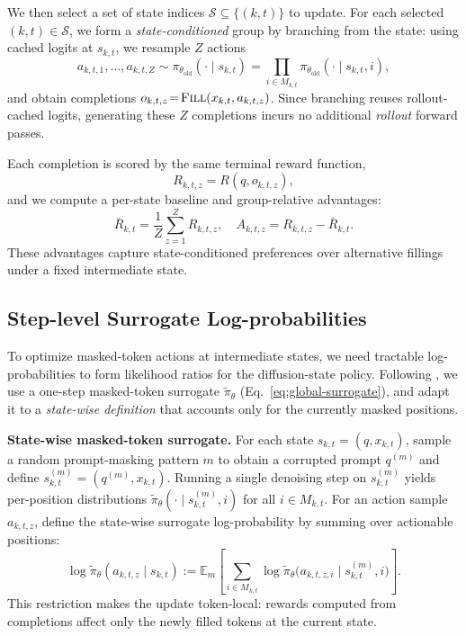 \documentclass{article}
\theoremstyle{plain}
\theoremstyle{definition}
\theoremstyle{remark}
\begin{document}
We then select a set of state indices $\mathcal{S}\subseteq\{(k,t)\}$ to update.
For each selected $(k,t)\in\mathcal{S}$, we form a \emph{state-conditioned} group by branching from the state:
using cached logits at $s_{k,t}$, we resample $Z$ actions
\[
  a_{k,t,1},\dots,a_{k,t,Z}
  \!\sim\!
  \pi_{\theta_{\text{old}}}(\cdot\!\mid\! s_{k,t})
  \!=\! \prod_{i\in M_{k,t}} \!\pi_{\theta_{\text{old}}}(\cdot\!\mid\! s_{k,t},i),
\]
and obtain completions $o_{k,t,z}\!=\!\textsc{Fill}(x_{k,t},a_{k,t,z})$.
Since branching reuses rollout-cached logits, generating these $Z$ completions incurs no additional \emph{rollout} forward passes.

Each completion is scored by the same terminal reward function,
\[
  R_{k,t,z} = R(q,o_{k,t,z}),
\]
and we compute a per-state baseline and group-relative advantages:
\begin{equation}
  \bar R_{k,t} = \frac{1}{Z}\sum_{z=1}^Z R_{k,t,z},
  \quad
  A_{k,t,z} = R_{k,t,z}-\bar R_{k,t}.
  \label{eq:group-adv}
\end{equation}
These advantages capture state-conditioned preferences over alternative fillings under a fixed intermediate state.


\subsection{Step-level Surrogate Log-probabilities}
\label{sec:method-surrogate}
To optimize masked-token actions at intermediate states, we need tractable log-probabilities to form likelihood ratios for the diffusion-state policy.
Following \citet{zhao2025d1}, we use a one-step masked-token surrogate $\tilde{\pi}_\theta$ (Eq.~\ref{eq:global-surrogate}), and adapt it to a \emph{state-wise definition} that accounts only for the currently masked positions.

\textbf{State-wise masked-token surrogate.}
For each state $s_{k,t}=(q,x_{k,t})$, sample a random prompt-masking pattern $m$ to obtain a corrupted prompt $q^{(m)}$ and define
$s_{k,t}^{(m)}\!=\!(q^{(m)},x_{k,t})$.
Running a single denoising step on $s_{k,t}^{(m)}$ yields per-position distributions $\tilde{\pi}_\theta(\cdot\!\mid\! s_{k,t}^{(m)},i)$ for all $i\in M_{k,t}$.
For an action sample $a_{k,t,z}$, define the state-wise surrogate log-probability by summing over actionable positions:
\begin{equation}
  \log \tilde{\pi}_\theta(a_{k,t,z}\!\mid\! s_{k,t})
  \!:=\!
  \mathbb{E}_{m}\!\!\left[
    \sum_{i\in M_{k,t}}
      \!\!\log \tilde{\pi}_\theta\bigl(a_{k,t,z,i}\!\mid\! s_{k,t}^{(m)}\!,\!i\bigr)
  \right].
  \label{eq:subset-logprob-method}
\end{equation}
This restriction makes the update token-local: rewards computed from completions affect only the newly filled tokens at the current state.
\end{document}
